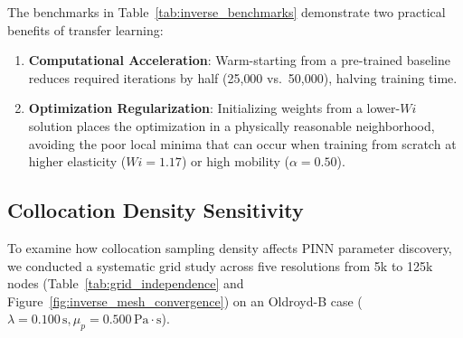 The benchmarks in Table~\ref{tab:inverse_benchmarks} demonstrate two practical
benefits of transfer learning:
\begin{enumerate}
    \item \textbf{Computational Acceleration}:
        Warm-starting from a pre-trained baseline reduces required iterations by half
        (25{,}000 vs.\ 50{,}000), halving training time.
    \item \textbf{Optimization Regularization}:
        Initializing weights from a lower-$Wi$ solution places the optimization in a
        physically reasonable neighborhood, avoiding the poor local minima that can
        occur when training from scratch at higher elasticity ($Wi = 1.17$) or high
        mobility ($\alpha = 0.50$).
\end{enumerate}

\subsection{Collocation Density Sensitivity}
\label{subsec:collocation_density_sensitivity}

To examine how collocation sampling density affects PINN parameter discovery, we
conducted a systematic grid study across five resolutions from 5k to 125k nodes
(Table~\ref{tab:grid_independence} and Figure~\ref{fig:inverse_mesh_convergence}) on
an Oldroyd-B case ($\lambda = 0.100\,\mathrm{s}, \mu_p = 0.500\,\mathrm{Pa\cdot s}$).

\begin{table}[H]
    \centering
    \caption{Collocation density sensitivity and parameter estimation accuracy across
    five resolutions
    ($\lambda^{\mathrm{true}} = 0.100\,\mathrm{s}, \mu_p^{\mathrm{true}} = 0.500\,\mathrm{Pa\cdot s}$).}
    \label{tab:grid_independence}
\end{table}

